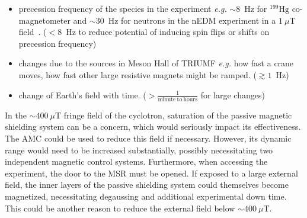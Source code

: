 \begin{itemize}
    \item  precession frequency of the species in the experiment {\it e.g.} $\sim8$~Hz for $\mathrm{^{199}Hg}$ co-magnetometer and $\sim30$~Hz for neutrons in the nEDM experiment in a $1~\mu$T field~\cite{bea_paper}. ($<8$~Hz to reduce potential of inducing spin flips or shifts on precession frequency)
    \item  changes due to the sources in Meson Hall of TRIUMF {\it e.g.} how fast a crane moves, how fast other large resistive magnets might be ramped. ($\gtrsim1$~Hz)
    \item  change of Earth's field with time. ($>\frac{1}{\mathrm{minute~to~hours}}$ for large changes)
\end{itemize}






In the $\sim400~\mu$T fringe field of the cyclotron, saturation of the passive magnetic shielding system can be a concern, which would seriously impact its effectiveness. The AMC could be used to reduce this field if necessary. However, its dynamic range would need to be increased substantially, possibly necessitating two independent magnetic control systems. Furthermore, when accessing the experiment, the door to the MSR must be opened. If exposed to a large external field, the inner layers of the passive shielding system could themselves become magnetized, necessitating degaussing and additional experimental down time. This could be another reason to reduce the external field below $\sim400~\mu$T.

